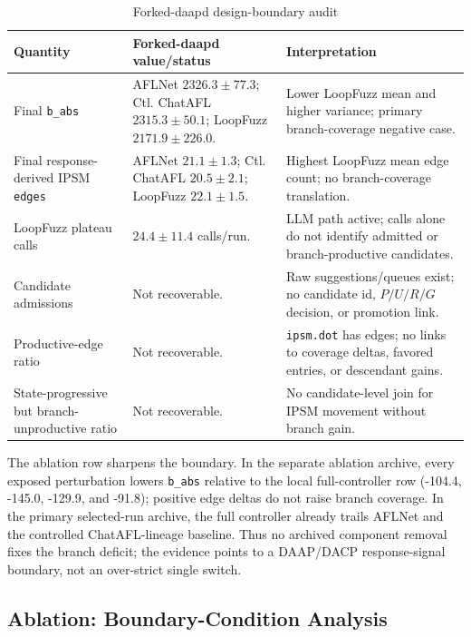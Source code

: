 \documentclass[final,5p,times,number]{elsarticle}
\begin{document}
\begin{table}[!t]
\centering
\caption{Forked-daapd design-boundary audit}
\label{tab:forked_design_boundary}
{\scriptsize
\setlength{\tabcolsep}{3.2pt}
\renewcommand{\arraystretch}{0.95}
\begin{tabularx}{\textwidth}{>{\raggedright\arraybackslash}p{}
                              >{\raggedright\arraybackslash}p{}
                              X}
\toprule
\textbf{Quantity} & \textbf{Forked-daapd value/status} & \textbf{Interpretation} \\
\midrule
Final \texttt{b\_abs} &
AFLNet $2326.3{\pm}77.3$; Ctl. ChatAFL $2315.3{\pm}50.1$; LoopFuzz $2171.9{\pm}226.0$. &
Lower LoopFuzz mean and higher variance; primary branch-coverage negative case. \\
\midrule
Final response-derived IPSM \texttt{edges} &
AFLNet $21.1{\pm}1.3$; Ctl. ChatAFL $20.5{\pm}2.1$; LoopFuzz $22.1{\pm}1.5$. &
Highest LoopFuzz mean edge count; no branch-coverage translation. \\
\midrule
LoopFuzz plateau calls &
$24.4{\pm}11.4$ calls/run. &
LLM path active; calls alone do not identify admitted or branch-productive candidates. \\
\midrule
Candidate admissions &
Not recoverable. &
Raw suggestions/queues exist; no candidate id, $P/U/R/G$ decision, or promotion link. \\
\midrule
Productive-edge ratio &
Not recoverable. &
\texttt{ipsm.dot} has edges; no links to coverage deltas, favored entries, or descendant gains. \\
\midrule
State-progressive but branch-unproductive ratio &
Not recoverable. &
No candidate-level join for IPSM movement without branch gain. \\
\bottomrule
\end{tabularx}
}
\end{table}

The ablation row sharpens the boundary. In the separate ablation archive, every exposed perturbation lowers \texttt{b\_abs} relative to the local full-controller row (-104.4, -145.0, -129.9, and -91.8); positive edge deltas do not raise branch coverage. In the primary selected-run archive, the full controller already trails AFLNet and the controlled ChatAFL-lineage baseline. Thus no archived component removal fixes the branch deficit; the evidence points to a DAAP/DACP response-signal boundary, not an over-strict single switch.

\subsection{Ablation: Boundary-Condition Analysis}
\end{document}
